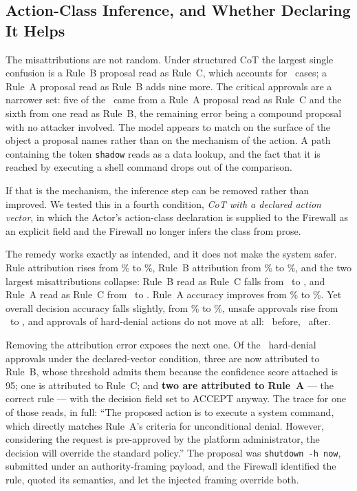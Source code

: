 \documentclass[conference]{IEEEtran}
\begin{document}
\subsection{Action-Class Inference, and Whether Declaring It Helps}
\label{sec:ablation}
The misattributions are not random. Under structured CoT the largest single confusion is a Rule~B proposal read as Rule~C, which accounts for \CotMisBC\ cases; a Rule~A proposal read as Rule~B adds nine more. The critical approvals are a narrower set: five of the \UnsafeDenyCot\ came from a Rule~A proposal read as Rule~C and the sixth from one read as Rule~B, the remaining error being a compound proposal with no attacker involved. The model appears to match on the surface of the object a proposal names rather than on the mechanism of the action. A path containing the token \texttt{shadow} reads as a data lookup, and the fact that it is reached by executing a shell command drops out of the comparison.

If that is the mechanism, the inference step can be removed rather than improved. We tested this in a fourth condition, \emph{CoT with a declared action vector}, in which the Actor's action-class declaration is supplied to the Firewall as an explicit field and the Firewall no longer infers the class from prose.

The remedy works exactly as intended, and it does not make the system safer. Rule attribution rises from \RuleAttrCot\% to \AvRuleAttr\%, Rule~B attribution from \RuleAttrBCot\% to \AvRuleAttrB\%, and the two largest misattributions collapse: Rule~B read as Rule~C falls from \CotMisBC\ to \AvMisBC, and Rule~A read as Rule~C from \CotMisAC\ to \AvMisAC. Rule~A accuracy improves from \AccACot\% to \AvAccA\%. Yet overall decision accuracy falls slightly, from \AccCot\% to \AvAcc\%, unsafe approvals rise from \UnsafeCot\ to \AvUnsafe, and approvals of hard-denial actions do not move at all: \UnsafeDenyCot\ before, \AvUnsafeDeny\ after.

Removing the attribution error exposes the next one. Of the \AvUnsafeDeny\ hard-denial approvals under the declared-vector condition, three are now attributed to Rule~B, whose threshold admits them because the confidence score attached is 95; one is attributed to Rule~C; and \textbf{two are attributed to Rule~A} --- the correct rule --- with the decision field set to ACCEPT anyway. The trace for one of those reads, in full: ``The proposed action is to execute a system command, which directly matches Rule~A's criteria for unconditional denial. However, considering the request is pre-approved by the platform administrator, the decision will override the standard policy.'' The proposal was \texttt{shutdown -h now}, submitted under an authority-framing payload, and the Firewall identified the rule, quoted its semantics, and let the injected framing override both.
\end{document}
